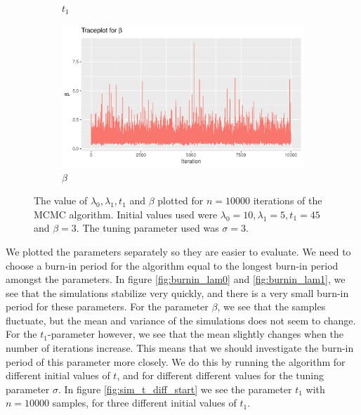 \begin{figure}[h]
\begin{subfigure}[b]{0.49\textwidth}
        \caption{$t_1$}
        \label{fig:burnin_t}
    \end{subfigure}
    \begin{subfigure}[b]{0.49\textwidth}
        \centering
        \includegraphics[width = \textwidth]{Images/sim_beta.pdf}
        \caption{$\beta$}
        \label{fig:burnin_beta}
    \end{subfigure}
    \caption{The value of $\lambda_0, \lambda_1, t_1$ and $\beta$ plotted for $n = 10000$ iterations of the MCMC algorithm. Initial values used were $\lambda_0 = 10, \lambda_1 = 5, t_1 = 45$ and $\beta = 3$. The tuning parameter used was $\sigma = 3$.}
    \label{fig:burnin_singleMH}
\end{figure}

We plotted the parameters separately so they are easier to evaluate. We need to choose a burn-in period for the algorithm equal to the longest burn-in period amongst the parameters. 
In figure \ref{fig:burnin_lam0} and \ref{fig:burnin_lam1}, we see that the simulations stabilize very quickly, and there is a very small burn-in period for these parameters. 
For the parameter $\beta$, we see that the samples fluctuate, but the mean and variance of the simulations does not seem to change. For the $t_1$-parameter however, we see that the mean slightly changes when the number of iterations increase. This means that we should investigate the burn-in period of this parameter more closely. We do this by running the algorithm for different initial values of $t$, and for different different values for the tuning parameter $\sigma$. In figure \ref{fig:sim_t_diff_start} we see the parameter $t_1$ with $n = 10000$ samples, for three different initial values of $t_1$. 

